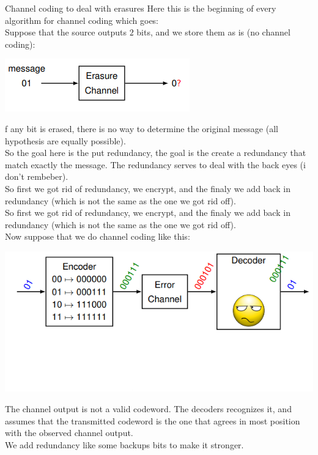 \begin{parag}{Channel coding to deal with erasures}
    Here this is the beginning of every algorithm for channel coding which goes:\\
    Suppose that the source outputs $2$ bits, and we store them as is (no channel coding):
\begin{center}
    \includegraphics[scale=1.2]{22025-04-29.png}
    
\end{center}
f any bit is erased, there is no way to determine the original message (all hypothesis are equally possible).\\
So the goal here is the put redundancy, the goal is the create a redundancy that match exactly the message. The redundancy serves to deal with the back eyes (i don't rembeber).\\
So first we got rid of redundancy, we encrypt, and the finaly we add back in redundancy (which is not the same as the one we got rid off).
\\    
So first we got rid of redundancy, we encrypt, and the finaly we add back in redundancy (which is not the same as the one we got rid off).
\\
Now suppose that we do channel coding like this:
\begin{center}
    \includegraphics[scale=1]{32025-04-29.png}
\end{center}
The channel output is not a valid codeword. The decoders recognizes it, and assumes that the transmitted codeword is the one that agrees in most position with the observed channel output.\\
We add redundancy like some backups bits to make it stronger. 

\end{parag}
